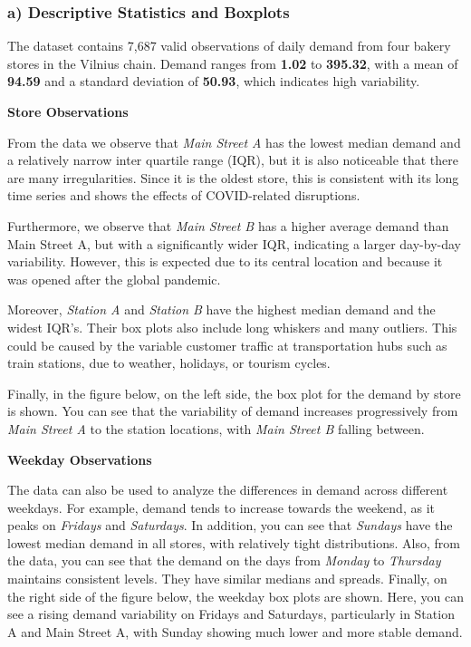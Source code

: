 
\subsubsection*{a) Descriptive Statistics and Boxplots}
\medskip
The dataset contains 7,687 valid observations of daily demand from four bakery stores in the Vilnius chain. Demand ranges from \textbf{1.02} to \textbf{395.32}, with a mean of \textbf{94.59} and a standard deviation of \textbf{50.93}, which indicates high variability.

\newpage
\noindent\textbf{Store Observations}

From the data we observe that \emph{Main Street A} has the lowest median demand and a relatively narrow inter quartile range (IQR), but it is also noticeable that there are many irregularities. Since it is the oldest store, this is consistent with its long time series and shows the effects of COVID-related disruptions.

Furthermore, we observe that \emph{Main Street B} has a higher average demand than Main Street A, but with a significantly wider IQR, indicating a larger day-by-day variability. However, this is expected due to its central location and because it was opened after the global pandemic.

Moreover, \emph{Station A} and \emph{Station B} have the highest median demand and the widest IQR's. Their box plots also include long whiskers and many outliers. This could be caused by the variable customer traffic at transportation hubs such as train stations, due to weather, holidays, or tourism cycles.

Finally, in the figure below, on the left side, the box plot for the demand by store is shown. You can see that the variability of demand increases progressively from \emph{Main Street A} to the station locations, with \emph{Main Street B} falling between. 

\bigskip
\noindent\textbf{Weekday Observations}

The data can also be used to analyze the differences in demand across different weekdays. For example, demand tends to increase towards the weekend, as it peaks on \emph{Fridays} and \emph{Saturdays}. 
 In addition, you can see that \emph{Sundays} have the lowest median demand in all stores, with relatively tight distributions.
 Also, from the data, you can see that the demand on the days from \emph{Monday} to \emph{Thursday} maintains consistent levels. They have similar medians and spreads.
 Finally, on the right side of the figure below, the weekday box plots are shown. Here, you can see a rising demand variability on Fridays and Saturdays, particularly in Station A and Main Street A, with Sunday showing much lower and more stable demand.


